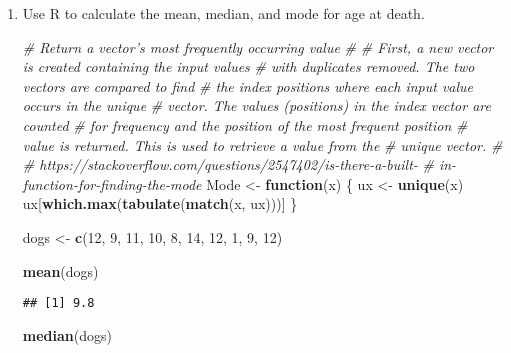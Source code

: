 \documentclass[]{article}
\newenvironment{Shaded}{\begin{snugshade}}{\end{snugshade}}
\newcommand{\KeywordTok}[1]{\textcolor[rgb]{0.13,0.29,0.53}{\textbf{#1}}}
\newcommand{\DecValTok}[1]{\textcolor[rgb]{0.00,0.00,0.81}{#1}}
\newcommand{\StringTok}[1]{\textcolor[rgb]{0.31,0.60,0.02}{#1}}
\newcommand{\CommentTok}[1]{\textcolor[rgb]{0.56,0.35,0.01}{\textit{#1}}}
\newcommand{\ControlFlowTok}[1]{\textcolor[rgb]{0.13,0.29,0.53}{\textbf{#1}}}
\newcommand{\NormalTok}[1]{#1}
\begin{document}
\begin{enumerate}
  \begin{enumerate}
  \def\labelenumii{\alph{enumii}.}
  \item
    Use R to calculate the mean, median, and mode for age at death.

\begin{Shaded}
\begin{Highlighting}[]
\CommentTok{# Return a vector's most frequently occurring value}
\CommentTok{#}
\CommentTok{# First, a new vector is created containing the input values }
\CommentTok{# with duplicates removed. The two vectors are compared to find}
\CommentTok{# the index positions where each input value occurs in the unique}
\CommentTok{# vector. The values (positions) in the index vector are counted}
\CommentTok{# for frequency and the position of the most frequent position }
\CommentTok{# value is returned. This is used to retrieve a value from the }
\CommentTok{# unique vector.}
\CommentTok{#}
\CommentTok{# https://stackoverflow.com/questions/2547402/is-there-a-built-}
\CommentTok{# in-function-for-finding-the-mode}
\NormalTok{Mode <-}\StringTok{ }\ControlFlowTok{function}\NormalTok{(x) \{}
\NormalTok{  ux <-}\StringTok{ }\KeywordTok{unique}\NormalTok{(x)}
\NormalTok{  ux[}\KeywordTok{which.max}\NormalTok{(}\KeywordTok{tabulate}\NormalTok{(}\KeywordTok{match}\NormalTok{(x, ux)))]}
\NormalTok{\}}
\end{Highlighting}
\end{Shaded}

\begin{Shaded}
\begin{Highlighting}[]
\NormalTok{dogs <-}\StringTok{ }\KeywordTok{c}\NormalTok{(}\DecValTok{12}\NormalTok{, }\DecValTok{9}\NormalTok{, }\DecValTok{11}\NormalTok{, }\DecValTok{10}\NormalTok{, }\DecValTok{8}\NormalTok{, }\DecValTok{14}\NormalTok{, }\DecValTok{12}\NormalTok{, }\DecValTok{1}\NormalTok{, }\DecValTok{9}\NormalTok{, }\DecValTok{12}\NormalTok{)}
\end{Highlighting}
\end{Shaded}

\begin{Shaded}
\begin{Highlighting}[]
\KeywordTok{mean}\NormalTok{(dogs)}
\end{Highlighting}
\end{Shaded}

\begin{verbatim}
## [1] 9.8
\end{verbatim}

\begin{Shaded}
\begin{Highlighting}[]
\KeywordTok{median}\NormalTok{(dogs)}
\end{Highlighting}
\end{Shaded}


\end{enumerate}
\end{enumerate}
\end{document}
